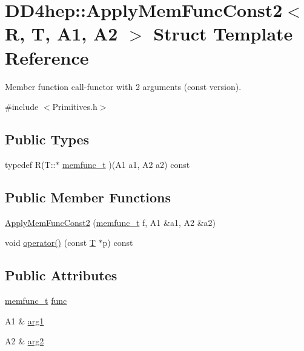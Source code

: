 \hypertarget{struct_d_d4hep_1_1_apply_mem_func_const2}{
\section{DD4hep::ApplyMemFuncConst2$<$ R, T, A1, A2 $>$ Struct Template Reference}
\label{struct_d_d4hep_1_1_apply_mem_func_const2}
}


Member function call-\/functor with 2 arguments (const version).  


{\ttfamily \#include $<$Primitives.h$>$}\subsection*{Public Types}
\begin{DoxyCompactItemize}
\item 
typedef R(T::$\ast$ \hyperlink{struct_d_d4hep_1_1_apply_mem_func_const2_acd005c15f4d84a4c7b322c1a8a2a8dc9}{memfunc\_\-t} )(A1 a1, A2 a2) const 
\end{DoxyCompactItemize}
\subsection*{Public Member Functions}
\begin{DoxyCompactItemize}
\item 
\hyperlink{struct_d_d4hep_1_1_apply_mem_func_const2_a41c881b9faf4f7f0fe9c82e3a39c4ca0}{ApplyMemFuncConst2} (\hyperlink{struct_d_d4hep_1_1_apply_mem_func_const2_acd005c15f4d84a4c7b322c1a8a2a8dc9}{memfunc\_\-t} f, A1 \&a1, A2 \&a2)
\item 
void \hyperlink{struct_d_d4hep_1_1_apply_mem_func_const2_a33cf5c2d4ab30451c66311278dd1b38d}{operator()} (const \hyperlink{class_t}{T} $\ast$p) const 
\end{DoxyCompactItemize}
\subsection*{Public Attributes}
\begin{DoxyCompactItemize}
\item 
\hyperlink{struct_d_d4hep_1_1_apply_mem_func_const2_acd005c15f4d84a4c7b322c1a8a2a8dc9}{memfunc\_\-t} \hyperlink{struct_d_d4hep_1_1_apply_mem_func_const2_a9a9dc912d8f9b572a684ebe92aa0af6d}{func}
\item 
A1 \& \hyperlink{struct_d_d4hep_1_1_apply_mem_func_const2_a5017a4de9fd2e68ad5c13d34ffd7c19d}{arg1}
\item 
A2 \& \hyperlink{struct_d_d4hep_1_1_apply_mem_func_const2_a96f3779267c92dcb4ff855fd360f62d5}{arg2}
\end{DoxyCompactItemize}


